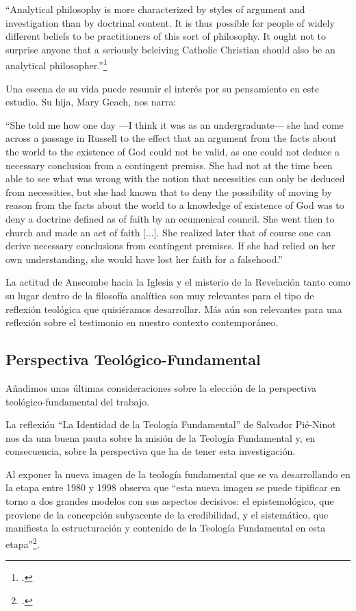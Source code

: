 \documentclass[12pt]{article}
\begin{document}
{``Analytical philosophy is more characterized by styles of argument and investigation than by doctrinal content. It is thus possible for people of widely different beliefs to be practitioners of this sort of philosophy. It ought not to surprise anyone that a seriously beleiving Catholic Christian should also be an analytical philosopher.''\footcite[p.~66]{opinionsanscombe}

Una escena de su vida puede resumir el interés por su pensamiento en este estudio. Su hija, Mary Geach, nos narra:

``She told me how one day ---I think it was as an undergraduate--- she had come across a passage in Russell to the effect that an argument from the facts about the world to the existence of God could not be valid, as one could not deduce a necessary conclusion from a contingent premiss. She had not at the time been able to see what was wrong with the notion that necessities can only be deduced from necessities, but she had known that to deny the possibility of moving by reason from the facts about the world to a knowledge of existence of God was to deny a doctrine defined as of faith by an ecumenical council. She went then to church and made an act of faith [...]. She realized later that of course one can derive necessary conclusions from contingent premises. If she had relied on her own understanding, she would have lost her faith for a falsehood.''

La actitud de Anscombe hacia la Iglesia y el misterio de la Revelación tanto como su lugar dentro de la filosofía analítica son muy relevantes para el tipo de reflexión teológica que quisiéramos desarrollar. Más aún son relevantes para una reflexión sobre el testimonio en nuestro contexto contemporáneo.

\subsection{Perspectiva Teológico-Fundamental}

Añadimos unas últimas consideraciones sobre la elección de la perspectiva teológico-fundamental del trabajo. 

La reflexión ``La Identidad de la Teología Fundamental'' de Salvador Pié-Ninot nos da una buena pauta sobre la misión de la Teología Fundamental y, en consecuencia, sobre la perspectiva que ha de tener esta investigación. 

Al exponer la nueva imagen de la teología fundamental que se va desarrollando en la etapa entre 1980 y 1998 observa que ``esta nueva imagen se puede tipificar en torno a dos grandes modelos con sus aspectos decisivos: el epistemológico, que proviene de la concepción subyacente de la credibilidad, y el sistemático, que manifiesta la estructuración y contenido de la Teología Fundamental en esta etapa''\footcite[p.~29]{ninotTF}.

}
\end{document}
